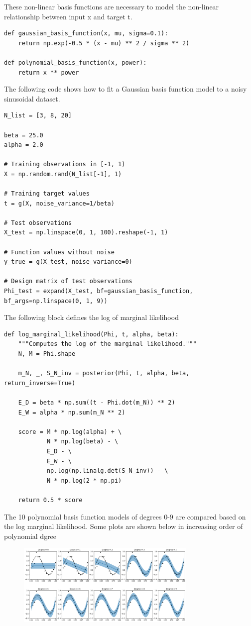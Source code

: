 \documentclass[journal,12pt,twocolumn]{IEEEtran}
\begin{document}
These non-linear basis functions are necessary to model the non-linear relationship between input x and target t.
\begin{lstlisting}
def gaussian_basis_function(x, mu, sigma=0.1):
    return np.exp(-0.5 * (x - mu) ** 2 / sigma ** 2)
    
def polynomial_basis_function(x, power):
    return x ** power
\end{lstlisting}
The following code shows how to fit a Gaussian basis function model to a noisy sinusoidal dataset.
\begin{lstlisting}
N_list = [3, 8, 20]

beta = 25.0
alpha = 2.0

# Training observations in [-1, 1)
X = np.random.rand(N_list[-1], 1)

# Training target values
t = g(X, noise_variance=1/beta)

# Test observations
X_test = np.linspace(0, 1, 100).reshape(-1, 1)

# Function values without noise 
y_true = g(X_test, noise_variance=0)
    
# Design matrix of test observations
Phi_test = expand(X_test, bf=gaussian_basis_function, bf_args=np.linspace(0, 1, 9))
\end{lstlisting}
The following block defines the log of marginal likelihood
\begin{lstlisting}
def log_marginal_likelihood(Phi, t, alpha, beta):
    """Computes the log of the marginal likelihood."""
    N, M = Phi.shape

    m_N, _, S_N_inv = posterior(Phi, t, alpha, beta, return_inverse=True)
    
    E_D = beta * np.sum((t - Phi.dot(m_N)) ** 2)
    E_W = alpha * np.sum(m_N ** 2)
    
    score = M * np.log(alpha) + \
            N * np.log(beta) - \
            E_D - \
            E_W - \
            np.log(np.linalg.det(S_N_inv)) - \
            N * np.log(2 * np.pi)

    return 0.5 * score
\end{lstlisting}
The 10 polynomial basis function models of degrees 0-9 are compared based on the log marginal likelihood. Some plots are shown below in increasing order of polynomial dgree
\begin{figure}[!h]
\begin{center}
\includegraphics[width=3.4in]{figs/fig1.png}
\end{center}
\caption{}
\label{fig:1}
\end{figure}
\end{document}
